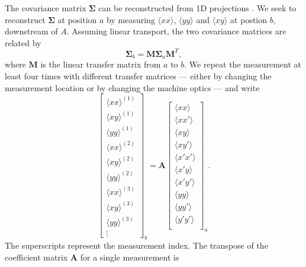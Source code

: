 The covariance matrix $\bm{\Sigma}$ can be reconstructed from 1D projections \cite{book:Minty2003, Woodley2000, Prat2014}. We seek to reconstruct $\bm{\Sigma}$ at position $a$ by measuring $\langle{xx}\rangle$, $\langle{yy}\rangle$ and $\langle{xy}\rangle$ at postion $b$, downstream of $A$. Assuming linear transport, the two covariance matrices are related by
%
\begin{equation}
    \bm{\Sigma}_b = \mathbf{M} \bm{\Sigma}_a \mathbf{M}^T,
\end{equation}
%
where $\mathbf{M}$ is the linear transfer matrix from $a$ to $b$. We repeat the measurement at least four times with different transfer matrices — either by changing the measurement location or by changing the machine optics — and write
%
\begin{equation}
    \begin{bmatrix}
        {\langle{xx}\rangle}^{(1)} \\
        {\langle{xy}\rangle}^{(1)} \\
        {\langle{yy}\rangle}^{(1)} \\
        {\langle{xx}\rangle}^{(2)} \\
        {\langle{xy}\rangle}^{(2)} \\
        {\langle{yy}\rangle}^{(2)} \\
        {\langle{xx}\rangle}^{(3)} \\
        {\langle{xy}\rangle}^{(3)} \\
        {\langle{yy}\rangle}^{(3)} \\
        \vdots
    \end{bmatrix}_b
    = \mathbf{A}
    \begin{bmatrix}
        \langle{xx}\rangle \\
        \langle{xx'}\rangle \\
        \langle{xy}\rangle \\
        \langle{xy'}\rangle \\
        \langle{x'x'}\rangle \\
        \langle{x'y}\rangle \\
        \langle{x'y'}\rangle \\
        \langle{yy}\rangle \\
        \langle{yy'}\rangle \\
        \langle{y'y'}\rangle \\
    \end{bmatrix}_a
    .
\end{equation}
%
The superscripts represent the measurement index. The transpose of the coefficient matrix $\mathbf{A}$ for a single measurement is
